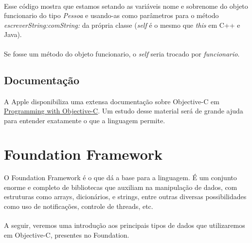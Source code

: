 \documentclass[a4paper,12pt,brazil,doubleside]{book}
\begin{document}
\bigskip

\paragraph{}Esse código mostra que estamos setando as variáveis nome e sobrenome do objeto funcionario do tipo \emph{Pessoa} e usando-as como parâmetros para o método \emph{escreverString:comString:} da própria classe (\textit{self} é o mesmo que \textit{this} em C++ e Java).
\paragraph{}Se fosse um método do objeto funcionario, o \textit{self} seria trocado por \emph{funcionario}.

\bigskip

\subsection{Documentação}

\paragraph{}A Apple disponibiliza uma extensa documentação sobre Objective-C em \href{https://developer.apple.com/library/ios/#documentation/Cocoa/Conceptual/ProgrammingWithObjectiveC/Introduction/Introduction.html}{Programming with Objective-C}. Um estudo desse material será de grande ajuda para entender exatamente o que a linguagem permite.

\bigskip
\bigskip


\section{Foundation Framework}

\paragraph{}O Foundation Framework é o que dá a base para a linguagem. É um conjunto enorme e completo de bibliotecas que auxiliam na manipulação de dados, com estruturas como arrays, dicionários, e strings, entre outras diversas possibilidades como uso de notificações, controle de threads, etc.
\paragraph{}A seguir, veremos uma introdução aos principais tipos de dados que utilizaremos em Objective-C, presentes no Foundation.
\end{document}
